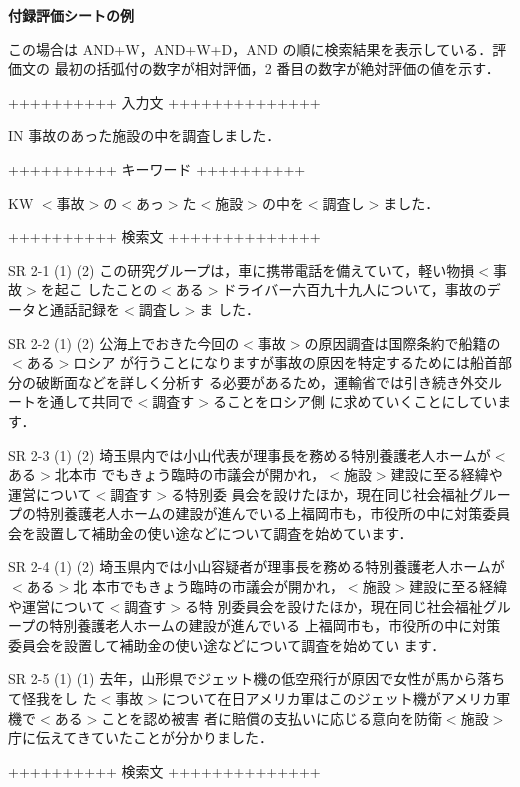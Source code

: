 \vspace{-2mm}
\bigskip\medskip
\noindent
{\Large\bf 付録\quad 評価シートの例}
\bigskip

\vspace{-2mm}
\label{app:sheet}
\normalbaselineskip
この場合は AND+W，AND+W+D，AND の順に検索結果を表示している．評価文の
最初の括弧付の数字が相対評価，2 番目の数字が絶対評価の値を示す．


++++++++++ 入力文 ++++++++++++++

IN 事故のあった施設の中を調査しました．

++++++++++ キーワード ++++++++++

KW $<$事故$>$の$<$あっ$>$た$<$施設$>$の中を$<$調査し$>$ました．

++++++++++ 検索文 ++++++++++++++

SR 2-1 (1) (2)  この研究グループは，車に携帯電話を備えていて，軽い物損$<$事故$>$を起こ\break
したことの$<$ある$>$ドライバー六百九十九人について，事故のデータと通話記録を$<$調査し$>$ま\break
した． 

SR 2-2 (1) (2)  公海上でおきた今回の$<$事故$>$の原因調査は国際条約で船籍の$<$ある$>$ロシア\break
が行うことになりますが事故の原因を特定するためには船首部分の破断面などを詳しく分析す\break
る必要があるため，運輸省では引き続き外交ルートを通して共同で$<$調査す$>$ることをロシア側\break
に求めていくことにしています． 

SR 2-3 (1) (2)  埼玉県内では小山代表が理事長を務める特別養護老人ホームが$<$ある$>$北本市\break
でもきょう臨時の市議会が開かれ，$<$施設$>$建設に至る経緯や運営について$<$調査す$>$る特別委\break
員会を設けたほか，現在同じ社会福祉グループの特別養護老人ホームの建設が進んでいる上福岡市も，市役所の中に対策委員会を設置して補助金の使い途などについて調査を始めています． 

SR 2-4 (1) (2)  埼玉県内では小山容疑者が理事長を務める特別養護老人ホームが$<$ある$>$北\break
本市でもきょう臨時の市議会が開かれ，$<$施設$>$建設に至る経緯や運営について$<$調査す$>$る特\break
別委員会を設けたほか，現在同じ社会福祉グループの特別養護老人ホームの建設が進んでいる\break
上福岡市も，市役所の中に対策委員会を設置して補助金の使い途などについて調査を始めてい\break
ます． 

SR 2-5 (1) (1)  去年，山形県でジェット機の低空飛行が原因で女性が馬から落ちて怪我をし\break
た$<$事故$>$について在日アメリカ軍はこのジェット機がアメリカ軍機で$<$ある$>$ことを認め被害\break
者に賠償の支払いに応じる意向を防衛$<$施設$>$庁に伝えてきていたことが分かりました． 

++++++++++ 検索文 ++++++++++++++

